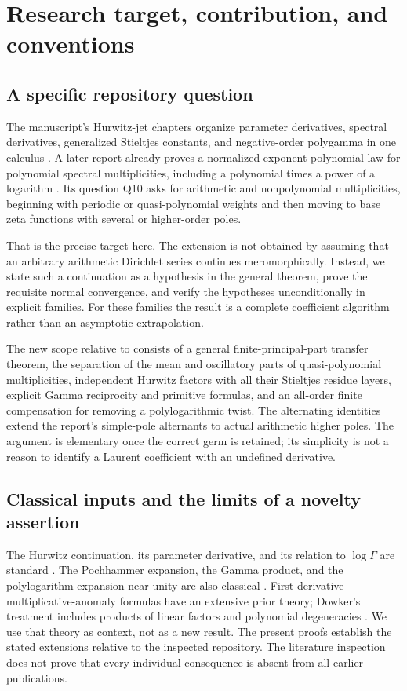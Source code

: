 \section{Research target, contribution, and conventions}
\label{asj:sec:scope}

\subsection{A specific repository question}
The manuscript's Hurwitz-jet chapters organize parameter derivatives, spectral
derivatives, generalized Stieltjes constants, and negative-order polygamma in one
calculus \cite{repo}. A later report already proves a normalized-exponent polynomial
law for polynomial spectral multiplicities, including a polynomial times a power of
a logarithm \cite{prior}. Its question Q10 asks for arithmetic and nonpolynomial
multiplicities, beginning with periodic or quasi-polynomial weights and then moving
to base zeta functions with several or higher-order poles.

That is the precise target here. The extension is not obtained by assuming that an
arbitrary arithmetic Dirichlet series continues meromorphically. Instead, we state
such a continuation as a hypothesis in the general theorem, prove the requisite
normal convergence, and verify the hypotheses unconditionally in explicit families.
For these families the result is a complete coefficient algorithm rather than an
asymptotic extrapolation.

The new scope relative to \cite{prior} consists of a general finite-principal-part
transfer theorem, the separation of the mean and oscillatory parts of
quasi-polynomial multiplicities, independent Hurwitz factors with all their
Stieltjes residue layers, explicit Gamma reciprocity and primitive formulas, and
an all-order finite compensation for removing a polylogarithmic twist. The
alternating identities extend the report's simple-pole alternants to actual
arithmetic higher poles. The argument is elementary once the correct germ is
retained; its simplicity is not a reason to identify a Laurent coefficient with
an undefined derivative.

\subsection{Classical inputs and the limits of a novelty assertion}
The Hurwitz continuation, its parameter derivative, and its relation to
$\log\Gamma$ are standard \cite{dlmf-hurwitz}. The Pochhammer expansion, the
Gamma product, and the polylogarithm expansion near unity are also classical
\cite{dlmf-gamma,dlmf-polylog}. First-derivative multiplicative-anomaly formulas
have an extensive prior theory; Dowker's treatment includes products of linear
factors and polynomial degeneracies \cite{dowker}. We use that theory as context,
not as a new result. The present proofs establish the stated extensions relative
to the inspected repository. The literature inspection does not prove that every
individual consequence is absent from all earlier publications.

